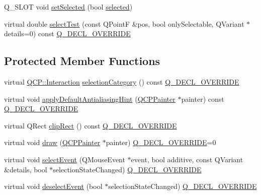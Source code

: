 \begin{DoxyCompactItemize}
\item 
Q\+\_\+\+S\+L\+OT void \hyperlink{class_q_c_p_abstract_legend_item_a6eed93b0ab99cb3eabb043fb08179c2b}{set\+Selected} (bool \hyperlink{class_q_c_p_abstract_legend_item_adf427dbb05d5f1a8e84c6abcb05becdf}{selected})
\item 
virtual double \hyperlink{class_q_c_p_abstract_legend_item_a80ec112a6608fc39dbed56239849b187}{select\+Test} (const Q\+PointF \&pos, bool only\+Selectable, Q\+Variant $\ast$details=0) const \hyperlink{qcustomplot_8h_a42cc5eaeb25b85f8b52d2a4b94c56f55}{Q\+\_\+\+D\+E\+C\+L\+\_\+\+O\+V\+E\+R\+R\+I\+DE}
\end{DoxyCompactItemize}
\subsection*{Protected Member Functions}
\begin{DoxyCompactItemize}
\item 
virtual \hyperlink{namespace_q_c_p_a2ad6bb6281c7c2d593d4277b44c2b037}{Q\+C\+P\+::\+Interaction} \hyperlink{class_q_c_p_abstract_legend_item_af8eb0fda0e11b0a23e1051b0102c8c6a}{selection\+Category} () const \hyperlink{qcustomplot_8h_a42cc5eaeb25b85f8b52d2a4b94c56f55}{Q\+\_\+\+D\+E\+C\+L\+\_\+\+O\+V\+E\+R\+R\+I\+DE}
\item 
virtual void \hyperlink{class_q_c_p_abstract_legend_item_a6bfbcb9ace779f4f6fe22241c32a67c9}{apply\+Default\+Antialiasing\+Hint} (\hyperlink{class_q_c_p_painter}{Q\+C\+P\+Painter} $\ast$painter) const \hyperlink{qcustomplot_8h_a42cc5eaeb25b85f8b52d2a4b94c56f55}{Q\+\_\+\+D\+E\+C\+L\+\_\+\+O\+V\+E\+R\+R\+I\+DE}
\item 
virtual Q\+Rect \hyperlink{class_q_c_p_abstract_legend_item_a806fa4d0104bdfc141aa8a36fcc9d51c}{clip\+Rect} () const \hyperlink{qcustomplot_8h_a42cc5eaeb25b85f8b52d2a4b94c56f55}{Q\+\_\+\+D\+E\+C\+L\+\_\+\+O\+V\+E\+R\+R\+I\+DE}
\item 
virtual void \hyperlink{class_q_c_p_abstract_legend_item_a14ce0b09f5b814c765a0d790bd838909}{draw} (\hyperlink{class_q_c_p_painter}{Q\+C\+P\+Painter} $\ast$painter) \hyperlink{qcustomplot_8h_a42cc5eaeb25b85f8b52d2a4b94c56f55}{Q\+\_\+\+D\+E\+C\+L\+\_\+\+O\+V\+E\+R\+R\+I\+DE}=0
\item 
virtual void \hyperlink{class_q_c_p_abstract_legend_item_a0081acfd8c4bb8ac4e9dcfe0f6c49b74}{select\+Event} (Q\+Mouse\+Event $\ast$event, bool additive, const Q\+Variant \&details, bool $\ast$selection\+State\+Changed) \hyperlink{qcustomplot_8h_a42cc5eaeb25b85f8b52d2a4b94c56f55}{Q\+\_\+\+D\+E\+C\+L\+\_\+\+O\+V\+E\+R\+R\+I\+DE}
\item 
virtual void \hyperlink{class_q_c_p_abstract_legend_item_aa1c0620558cc8e2a2e6fb7ab558f6097}{deselect\+Event} (bool $\ast$selection\+State\+Changed) \hyperlink{qcustomplot_8h_a42cc5eaeb25b85f8b52d2a4b94c56f55}{Q\+\_\+\+D\+E\+C\+L\+\_\+\+O\+V\+E\+R\+R\+I\+DE}
\end{DoxyCompactItemize}
